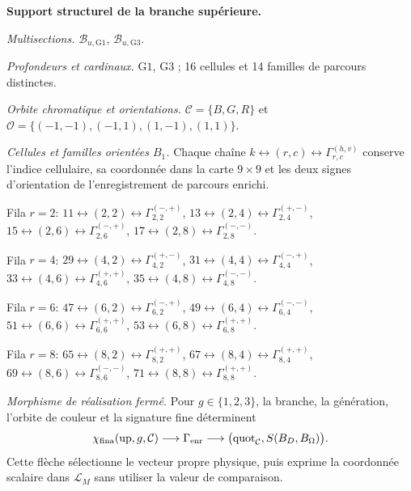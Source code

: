 \noindent\textbf{Support structurel de la branche supérieure.}\par
\noindent\textit{Multisections.} \(\mathcal B_{u,\mathrm{G1}}\), \(\mathcal B_{u,\mathrm{G3}}\).\par
\noindent\textit{Profondeurs et cardinaux.} $\mathrm{G1}$, $\mathrm{G3}$ ; 16 cellules et 14 familles de parcours distinctes.\par
\noindent\textit{Orbite chromatique et orientations.} $\mathcal C=\{B,G,R\}$ et $\mathcal O=\{(-1,-1),(-1,1),(1,-1),(1,1)\}$.\par
\noindent\textit{Cellules et familles orientées $B_1$.} Chaque chaîne $k\leftrightarrow(r,c)\leftrightarrow\Gamma_{r,c}^{(h,v)}$ conserve l’indice cellulaire, sa coordonnée dans la carte $9\times9$ et les deux signes d’orientation de l’enregistrement de parcours enrichi.\par
\noindent Fila $r=2$: $11\leftrightarrow(2,2)\leftrightarrow\Gamma_{2,2}^{(-,+)}$, $13\leftrightarrow(2,4)\leftrightarrow\Gamma_{2,4}^{(+,-)}$, $15\leftrightarrow(2,6)\leftrightarrow\Gamma_{2,6}^{(-,+)}$, $17\leftrightarrow(2,8)\leftrightarrow\Gamma_{2,8}^{(-,-)}$.\par
\noindent Fila $r=4$: $29\leftrightarrow(4,2)\leftrightarrow\Gamma_{4,2}^{(+,-)}$, $31\leftrightarrow(4,4)\leftrightarrow\Gamma_{4,4}^{(-,+)}$, $33\leftrightarrow(4,6)\leftrightarrow\Gamma_{4,6}^{(+,+)}$, $35\leftrightarrow(4,8)\leftrightarrow\Gamma_{4,8}^{(-,-)}$.\par
\noindent Fila $r=6$: $47\leftrightarrow(6,2)\leftrightarrow\Gamma_{6,2}^{(-,+)}$, $49\leftrightarrow(6,4)\leftrightarrow\Gamma_{6,4}^{(-,-)}$, $51\leftrightarrow(6,6)\leftrightarrow\Gamma_{6,6}^{(+,+)}$, $53\leftrightarrow(6,8)\leftrightarrow\Gamma_{6,8}^{(+,+)}$.\par
\noindent Fila $r=8$: $65\leftrightarrow(8,2)\leftrightarrow\Gamma_{8,2}^{(+,+)}$, $67\leftrightarrow(8,4)\leftrightarrow\Gamma_{8,4}^{(+,+)}$, $69\leftrightarrow(8,6)\leftrightarrow\Gamma_{8,6}^{(-,-)}$, $71\leftrightarrow(8,8)\leftrightarrow\Gamma_{8,8}^{(+,+)}$.\par
\noindent\textit{Morphisme de réalisation fermé.} Pour $g\in\{1,2,3\}$, la branche, la génération, l’orbite de couleur et la signature fine déterminent
\[\chi_{\rm fina}(\operatorname{up},g,\mathcal C)\longrightarrow\Gamma_{\rm enr}\longrightarrow\bigl(\operatorname{quot}_{\mathcal C},S(B_D,B_\Omega)\bigr).\]
Cette flèche sélectionne le vecteur propre physique, puis exprime la coordonnée scalaire dans $\mathcal L_M$ sans utiliser la valeur de comparaison.\par
